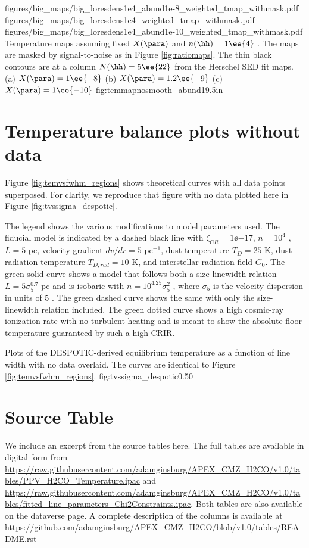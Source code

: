 \RotFigureThreeAA
{figures/big_maps/big_loresdens1e4_abund1e-8_weighted_tmap_withmask.pdf}
{figures/big_maps/big_loresdens1e4_weighted_tmap_withmask.pdf}
{figures/big_maps/big_loresdens1e4_abund1e-10_weighted_tmap_withmask.pdf}
{Temperature maps assuming fixed $X(\para)$ and $n(\hh)=1\ee{4}$ \percc.  The
maps are masked by signal-to-noise as in Figure \ref{fig:ratiomaps}.  The thin
black contours are at a column $N(\hh)=5\ee{22}$ \percc from the Herschel SED
fit maps.
(a) $X(\para) = 1\ee{-8}$
(b) $X(\para) = 1.2\ee{-9}$
(c) $X(\para) = 1\ee{-10}$
}
{fig:temmapnosmooth_abund}{1}{9.5in}

\section{Temperature balance plots without data}
\label{sec:despoticplots}
Figure \ref{fig:temvsfwhm_regions} shows theoretical curves with all data
points superposed.  For clarity, we reproduce that figure with no data plotted
here in Figure \ref{fig:tvssigma_despotic}.

The legend shows the various modifications to model parameters used.  The
fiducial model is indicated by a dashed black line with $\zeta_{CR} =
1\ee{-17}$, $n=10^4$ \percc, $L=5$ pc, velocity gradient $dv/dr=5$ \kms
pc$^{-1}$, dust temperature $T_D=25$ K, dust radiation temperature $T_{D,rad} =
10$ K, and interstellar radiation field $G_0$.  The green solid curve shows a
model that follows both a size-linewidth relation $L=5 \sigma_5^{0.7}$ pc and
is isobaric with $n=10^{4.25} \sigma_5^2$ \percc, where $\sigma_5$ is the
velocity dispersion in units of 5 \kms.  The green dashed curve shows the same
with only the size-linewidth relation included.  The green dotted curve shows a
high cosmic-ray ionization rate with no turbulent heating and is meant to show
the absolute floor temperature guaranteed by such a high CRIR.


{Plots of the DESPOTIC-derived equilibrium temperature as a function of line
width with no data overlaid.  The curves are identical to Figure
\ref{fig:temvsfwhm_regions}.}
{fig:tvssigma_despotic}{0.5}{0}

\section{Source Table}
We include an excerpt from the source tables here.  The full tables are
available in digital form from
\url{https://raw.githubusercontent.com/adamginsburg/APEX_CMZ_H2CO/v1.0/tables/PPV_H2CO_Temperature.ipac}
and
\url{https://raw.githubusercontent.com/adamginsburg/APEX_CMZ_H2CO/v1.0/tables/fitted_line_parameters_Chi2Constraints.ipac}.
Both tables are also available on the dataverse page.
A complete description of the columns is available at
\url{https://github.com/adamginsburg/APEX_CMZ_H2CO/blob/v1.0/tables/README.rst}







